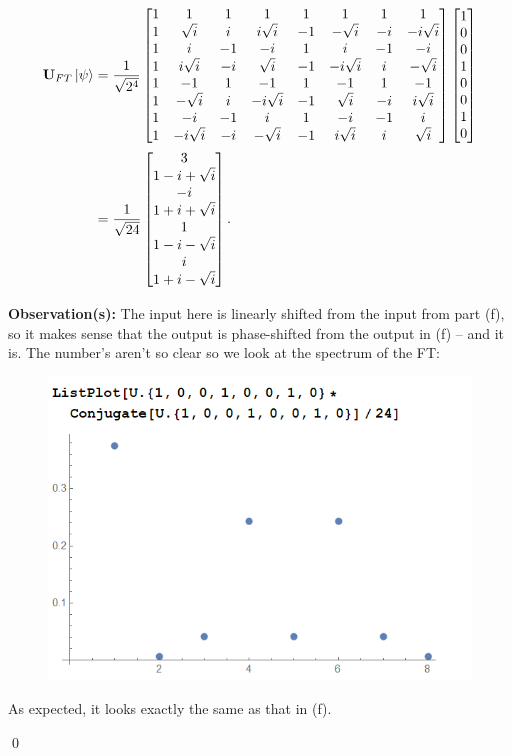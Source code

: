 \documentclass{book}
\theoremstyle{definition}
\newcommand{\nn}{\nonumber}
\newcommand{\f}[2]{\frac{#1}{#2}}
\newcommand{\U}{\mathbf{U}}
\begin{document}
\begin{enumerate}[(a)]
	\begin{align}
	\U_{FT}\ket{\psi} &= \f{1}{\sqrt{2^4}}\begin{bmatrix}
	1 & 1 & 1 & 1 & 1 & 1 & 1 & 1\\
	1 &\sqrt{i}&i&i\sqrt{i}&-1&-\sqrt{i}&-i&-i\sqrt{i}\\
	1&i&-1&-i&1&i&-1&-i\\
	1&i\sqrt{i}&-i&\sqrt{i}&-1&-i\sqrt{i}&i&-\sqrt{i}\\
	1 & -1 & 1 & -1 & 1 & -1 & 1 & -1\\
	1&-\sqrt{i}&i&-i\sqrt{i}&-1&\sqrt{i}&-i&i\sqrt{i}\\
	1&-i&-1&i&1&-i&-1&i\\
	1&-i\sqrt{i}&-i&-\sqrt{i}&-1&i\sqrt{i}&i&\sqrt{i}
	\end{bmatrix}
	\begin{bmatrix}
	1\\0\\0\\1\\0\\0\\1\\0
	\end{bmatrix}\nn\\
	&= \f{1}{\sqrt{24}}\begin{bmatrix}
	3\\1-i+\sqrt{i}\\-i\\1+i+\sqrt{i}\\1\\1-i-\sqrt{i}\\i\\1+i-\sqrt{i}
	\end{bmatrix}.
	\end{align}
	
	\textbf{Observation(s):} The input here is linearly shifted from the input from part (f), so it makes sense that the output is phase-shifted from the output in (f) -- and it is. The number's aren't so clear so we look at the spectrum of the FT: 
	\begin{figure}[!htb]
		\centering
		\includegraphics[scale=0.5]{period1}
	\end{figure}
	As expected, it looks exactly the same as that in (f).
	
\end{enumerate}\qed
\end{document}
